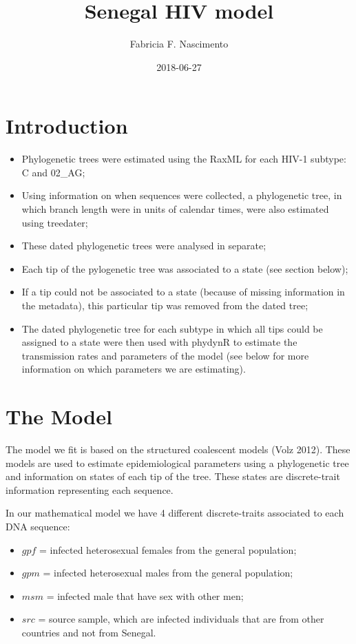\documentclass[12pt,]{article}
\title{Senegal HIV model}
\author{Fabricia F. Nascimento}
\date{2018-06-27}
\providecommand{\tightlist}{%
  \setlength{\itemsep}{0pt}\setlength{\parskip}{0pt}}
\begin{document}
\maketitle

\hypertarget{introduction}{%
\section{Introduction}\label{introduction}}

\begin{itemize}
\tightlist
\item
  Phylogenetic trees were estimated using the RaxML for each HIV-1
  subtype: C and 02\_AG;
\item
  Using information on when sequences were collected, a phylogenetic
  tree, in which branch length were in units of calendar times, were
  also estimated using treedater;
\item
  These dated phylogenetic trees were analysed in separate;
\item
  Each tip of the pylogenetic tree was associated to a state (see
  section below);
\item
  If a tip could not be associated to a state (because of missing
  information in the metadata), this particular tip was removed from the
  dated tree;
\item
  The dated phylogenetic tree for each subtype in which all tips could
  be assigned to a state were then used with phydynR to estimate the
  transmission rates and parameters of the model (see below for more
  information on which parameters we are estimating).
\end{itemize}

\hypertarget{the-model}{%
\section{The Model}\label{the-model}}

The model we fit is based on the structured coalescent models (Volz
2012). These models are used to estimate epidemiological parameters
using a phylogenetic tree and information on states of each tip of the
tree. These states are discrete-trait information representing each
sequence.

In our mathematical model we have 4 different discrete-traits associated
to each DNA sequence:

\begin{itemize}
\tightlist
\item
  \(gpf\) = infected heterosexual females from the general population;
\item
  \(gpm\) = infected heterosexual males from the general population;
\item
  \(msm\) = infected male that have sex with other men;
\item
  \(src\) = source sample, which are infected individuals that are from
  other countries and not from Senegal.
\end{itemize}
\end{document}
